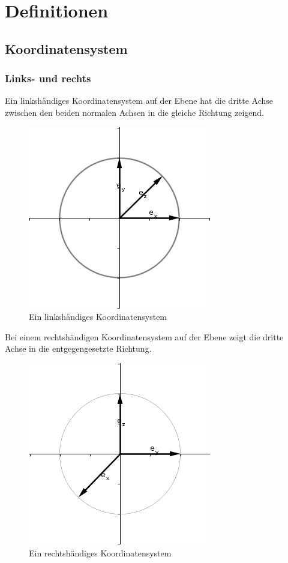 \documentclass[a4paper]{article}
\begin{document}
\section{Definitionen}

\subsection{Koordinatensystem}
\subsubsection{Links- und rechts}
Ein linksh\"andiges Koordinatensystem auf der Ebene hat die dritte Achse zwischen den beiden normalen Achsen in die gleiche Richtung zeigend.

\begin{figure}
\caption{Ein linksh\"andiges Koordinatensystem}
\includegraphics[scale=0.5]{lefthand45.png}
\end{figure}

Bei einem rechtsh\"andigen Koordinatensystem auf der Ebene zeigt die dritte Achse in die entgegengesetzte Richtung.

\begin{figure}
\caption{Ein rechtsh\"andiges Koordinatensystem}
\includegraphics[scale=0.5]{righthand45.png}
\end{figure}
\end{document}

